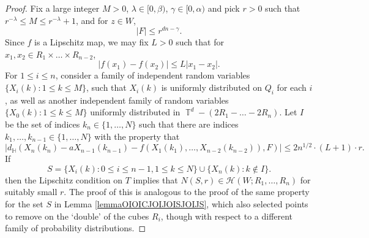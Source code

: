 \documentclass[dvipsnames,letterpaper,12pt]{article}
\numberwithin{equation}{section}
\DeclareMathOperator{\TT}{\mathbb{T}}
\numberwithin{theorem}{section}
\begin{document}
\begin{proof}
    Fix a large integer $M > 0$, $\lambda \in [0,\beta)$, $\gamma \in [0,\alpha)$ and pick $r > 0$ such that $r^{-\lambda} \leq M \leq r^{-\lambda} + 1$, and for $z \in W$,
    \[ |F| \leq r^{dn - \gamma}. \]
    Since $f$ is a Lipschitz map, we may fix $L > 0$ such that for $x_1,x_2 \in R_1 \times \dots \times R_{n-2}$,
    \[ |f(x_1) - f(x_2)| \leq L |x_1 - x_2|. \]
    For $1 \leq i \leq n$, consider a family of independent random variables $\{ X_i(k): 1 \leq k \leq M \}$, such that $X_i(k)$ is uniformly distributed on $Q_i$ for each $i$, as well as another independent family of random variables $\{ X_0(k): 1 \leq k \leq M \}$ uniformly distributed in $\TT^d - (2R_1 - \dots - 2R_n)$. Let $I$ be the set of indices $k_n \in \{ 1, \dots, N \}$ such that there are indices $k_1,\dots,k_{n-1} \in \{ 1, \dots, N \}$ with the property that
    \begin{equation}
        |d_{\mathbb{H}}(X_n(k_n) - a X_{n-1}(k_{n-1}) - f(X_1(k_1), \dots, X_{n-2}(k_{n-2})), F)| \leq 2 n^{1/2} \cdot (L+1) \cdot r.
    \end{equation}
    If
    \[ S = \{ X_i(k) : 0 \leq i \leq n-1, 1 \leq k \leq N \} \cup \{ X_n(k): k \not \in I \}. \]
    then the Lipschitz condition on $T$ implies that $N(S,r) \in \mathcal{H}(W;R_1,\dots,R_n)$ for suitably small $r$. The proof of this is analogous to the proof of the same property for the set $S$ in Lemma \ref{lemmaOIOICJOIJOISJOIJS}, which also selected points to remove on the `double' of the cubes $R_i$, though with respect to a different family of probability distributions.


\end{proof}
\end{document}
